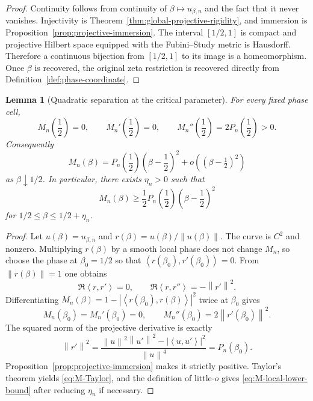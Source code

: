 \documentclass[11pt]{amsart}
\numberwithin{equation}{section}
\newtheorem{lemma}[theorem]{Lemma}
\newcommand{\ip}[2]{\left\langle #1,#2\right\rangle}
\newcommand{\norm}[1]{\left\lVert #1\right\rVert}
\begin{document}
\begin{proof}
Continuity follows from continuity of $\beta\mapsto u_{\beta,n}$ and the fact
that it never vanishes.  Injectivity is
Theorem~\ref{thm:global-projective-rigidity}, and immersion is
Proposition~\ref{prop:projective-immersion}.  The interval $[1/2,1]$ is compact
and projective Hilbert space equipped with the Fubini--Study metric is
Hausdorff.  Therefore a continuous bijection from $[1/2,1]$ to its image is a
homeomorphism.  Once $\beta$ is recovered, the original zeta restriction is
recovered directly from Definition~\ref{def:phase-coordinate}.
\end{proof}

\begin{lemma}[Quadratic separation at the critical parameter]
\label{lem:quadratic-separation}
For every fixed phase cell,
\begin{equation}
 M_n\!\left(\frac12\right)=0,
 \qquad
 M_n'\!\left(\frac12\right)=0,
 \qquad
 M_n''\!\left(\frac12\right)=2P_n\!\left(\frac12\right)>0.
 \label{eq:M-second-derivative}
\end{equation}
Consequently
\begin{equation}
 \boxed{
 M_n(\beta)
 =P_n\!\left(\frac12\right)
 \left(\beta-\frac12\right)^2
 +o\!\left((\beta-\tfrac12)^2\right)
 }
 \label{eq:M-Taylor}
\end{equation}
as $\beta\downarrow1/2$.  In particular, there exists $\eta_n>0$ such that
\begin{equation}
 M_n(\beta)
 \geq
 \frac12P_n\!\left(\frac12\right)
 \left(\beta-\frac12\right)^2
 \label{eq:M-local-lower-bound}
\end{equation}
for $1/2\leq\beta\leq1/2+\eta_n$.
\end{lemma}

\begin{proof}
Let $u(\beta)=u_{\beta,n}$ and $r(\beta)=u(\beta)/\norm{u(\beta)}$.
The curve is $C^2$ and nonzero.  Multiplying $r(\beta)$ by a smooth local
phase does not change $M_n$, so choose the phase at $\beta_0=1/2$ so that
$\ip{r(\beta_0)}{r'(\beta_0)}=0$.  From $\norm{r(\beta)}=1$ one obtains
\begin{equation}
 \Re\ip{r}{r'}=0,
 \qquad
 \Re\ip{r}{r''}=-\norm{r'}^2.
 \label{eq:normalized-derivatives}
\end{equation}
Differentiating
$M_n(\beta)=1-|\ip{r(\beta_0)}{r(\beta)}|^2$ twice at $\beta_0$ gives
\begin{equation}
 M_n(\beta_0)=M_n'(\beta_0)=0,
 \qquad
 M_n''(\beta_0)=2\norm{r'(\beta_0)}^2.
 \label{eq:M-second-r}
\end{equation}
The squared norm of the projective derivative is exactly
\begin{equation}
 \norm{r'}^2
 =\frac{\norm{u}^2\norm{u'}^2-|\ip{u}{u'}|^2}{\norm{u}^4}
 =P_n(\beta_0).
 \label{eq:r-prime-P}
\end{equation}
Proposition~\ref{prop:projective-immersion} makes it strictly positive.  Taylor's
theorem yields \eqref{eq:M-Taylor}, and the definition of little-$o$ gives
\eqref{eq:M-local-lower-bound} after reducing $\eta_n$ if necessary.
\end{proof}
\end{document}
